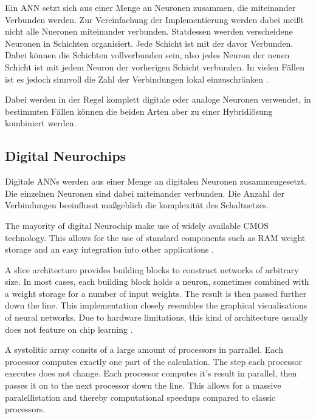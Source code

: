 \documentclass[conference]{IEEEtran}
\begin{document}
    Ein ANN setzt sich aus einer Menge an Neuronen zusammen, die miteinander Verbunden werden.
    Zur Vereinfachung der Implementierung werden dabei meißt nicht alle Nueronen miteinander verbunden.
    Statdessen weerden verscheidene Neuronen in Schichten organisiert.
    Jede Schicht ist mit der davor Verbunden.
    Dabei können die Schichten vollverbunden sein, also jedes Neuron der neuen Schicht ist mit jedem Neuron der vorherigen Schicht verbunden.
    In vielen Fällen ist es jedoch sinnvoll die Zahl der Verbindungen lokal einzuschränken \cite{boser1991analog} .

    Dabei werden in der Regel komplett digitale oder analoge Neuronen verwendet, in bestimmten Fällen können die beiden Arten aber zu einer Hybridlösung kombiniert werden.


    \subsection{Digital Neurochips}

    Digitale ANNs werden aus einer Menge an digitalen Neuronen zusammengesetzt.
    Die einzelnen Neuronen sind dabei miteinander verbunden.
    Die Anzahl der Verbindungen beeinflusst maßgeblich die komplexität des Schaltnetzes.

    The mayority of digital Neurochip make use of widely available CMOS technology.
    This allows for the use of standard components such as RAM weight storage and an easy integration into other applications \cite{dias2004artificial}.

    A slice architecture provides building blocks to construct networks of arbitrary size.
    In most cases, each building block holds a neuron, sometimes combined with a weight storage for a number of input weights.
    The result is then passed further down the line.
    This implementation closely resembles the graphical visualisations of neural networks.
    Due to hardware limitations, this kind of architecture usually does not feature on chip learning \cite{dias2004artificial}.

    A systolitic array consits of a large amount of processors in parrallel.
    Each processor computes exactly one part of the calculation.
    The step each processor executes does not change.
    Each processor computes it's result in parallel, then passes it on to the next processor down the line.
    This allows for a massive paralellistation and thereby computational speedups compared to classic processors.
\end{document}
